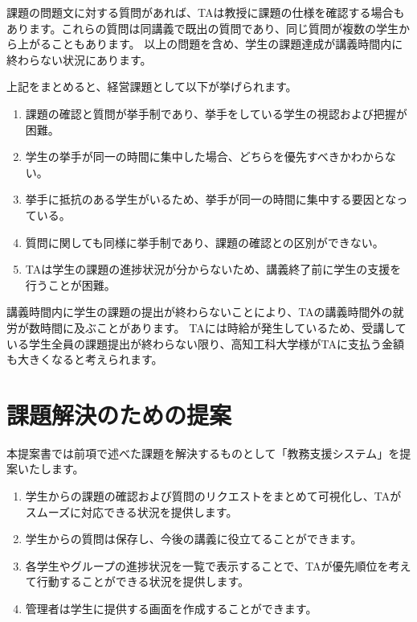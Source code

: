\documentclass[a4j,titlepage]{ujarticle}
\begin{document}
課題の問題文に対する質問があれば、TAは教授に課題の仕様を確認する場合もあります。これらの質問は同講義で既出の質問であり、同じ質問が複数の学生から上がることもあります。
以上の問題を含め、学生の課題達成が講義時間内に終わらない状況にあります。

上記をまとめると、経営課題として以下が挙げられます。
\begin{enumerate}[(1)]
\item 課題の確認と質問が挙手制であり、挙手をしている学生の視認および把握が困難。
\item 学生の挙手が同一の時間に集中した場合、どちらを優先すべきかわからない。
\item 挙手に抵抗のある学生がいるため、挙手が同一の時間に集中する要因となっている。
\item 質問に関しても同様に挙手制であり、課題の確認との区別ができない。
\item TAは学生の課題の進捗状況が分からないため、講義終了前に学生の支援を行うことが困難。
\end{enumerate}
講義時間内に学生の課題の提出が終わらないことにより、TAの講義時間外の就労が数時間に及ぶことがあります。
TAには時給が発生しているため、受講している学生全員の課題提出が終わらない限り、高知工科大学様がTAに支払う金額も大きくなると考えられます。

\section{課題解決のための提案}
本提案書では前項で述べた課題を解決するものとして「教務支援システム」を提案いたします。

\begin{enumerate}[(1)]
\item 学生からの課題の確認および質問のリクエストをまとめて可視化し、TAがスムーズに対応できる状況を提供します。
\item 学生からの質問は保存し、今後の講義に役立てることができます。
\item 各学生やグループの進捗状況を一覧で表示することで、TAが優先順位を考えて行動することができる状況を提供します。
\item 管理者は学生に提供する画面を作成することができます。
\end{enumerate}
\end{document}
